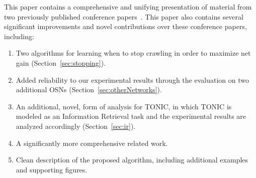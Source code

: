 \documentclass[journal]{IEEEtran}
\begin{document}





This paper contains a comprehensive and unifying presentation of material from two previously published conference papers~\cite{stern2013tonic,samama2014extended}. 
This paper also contains several significant improvements and novel contributions over these conference papers, including:
\begin{enumerate}
\item Two algorithms for learning when to stop crawling in order to maximize net gain (Section~\ref{sec:stopping}). 
\item Added reliability to our experimental results through the evaluation on two additional OSNs (Section~\ref{sec:otherNetworks}). 
\item An additional, novel, form of analysis for TONIC, in which TONIC is modeled as an Information Retrieval task and the experimental results are analyzed accordingly (Section~\ref{sec:ir}). 
\item A significantly more comprehensive related work. 
\item Clean description of the proposed algorithm, including additional examples and supporting figures. 
\end{enumerate}
\end{document}
